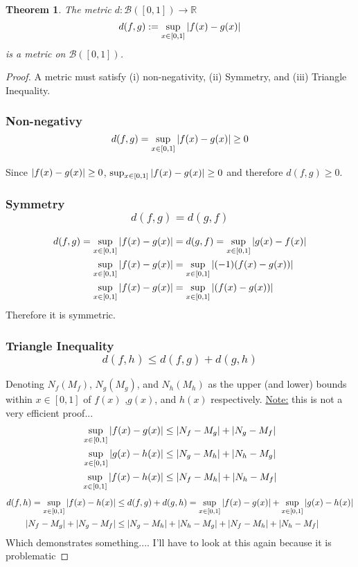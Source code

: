 \documentclass[]{article}
\newcommand{\R}{\mathbb{R}}
\newtheorem{theorem}{Theorem}
\begin{document}
\begin{theorem}
    The metric $d : \mathcal{B}([0,1]) \to \R$
    \[d(f,g) := \sup_{x \in [0,1]} \abs{f(x) - g(x)}\]
    is a metric on $\mathcal{B}([0,1])$.
\end{theorem}
\begin{proof}
    A metric must satisfy (i) non-negativity, 
    (ii) Symmetry, and (iii) Triangle Inequality.
    \subsubsection{Non-negativy \[d(f,g) = \sup_{x \in [0,1]} \abs{f(x) - g(x)} \geq 0\]}
        Since $\abs{f(x) - g(x)} \geq 0$, $\sup_{x \in [0,1]} \abs{f(x) - g(x)} \geq 0$ and therefore $d(f,g) \geq 0$.
    \subsubsection{Symmetry \[d(f,g) = d(g,f)\]}
    \begin{align*}
        d(f,g) = \sup_{x \in [0,1]} \abs{f(x) - g(x)} &= d(g,f) = \sup_{x \in [0,1]} \abs{g(x) - f(x)}\\
        \sup_{x \in [0,1]} \abs{f(x) - g(x)} &= \sup_{x \in [0,1]} \abs{(-1)(f(x) -g(x))}\\
        \sup_{x \in [0,1]} \abs{f(x) - g(x)} &= \sup_{x \in [0,1]} \abs{(f(x) -g(x))}
    \end{align*}
    Therefore it is symmetric.
    \subsubsection{Triangle Inequality \[d(f,h) \leq d(f,g) + d(g,h)\]}
    Denoting $N_f (M_f)$, $N_g (M_g)$, and $N_h (M_h)$ as the upper (and lower) bounds within $x \in [0,1]$ of $f(x)$ ,$g(x)$, and $h(x)$ respectively. \underline{Note:} this is not a very efficient proof...
    \begin{align*}
        \sup_{x \in [0,1]} \abs{f(x) - g(x)} &\leq \abs{N_f - M_g} + \abs{N_g - M_f}\\
        \sup_{x \in [0,1]} \abs{g(x) - h(x)} &\leq \abs{N_g - M_h} + \abs{N_h - M_g}\\
        \sup_{x \in [0,1]} \abs{f(x) - h(x)} &\leq \abs{N_f - M_h} + \abs{N_h - M_f}
    \end{align*}
    \begin{align*}
        d(f,h) = \sup_{x \in [0,1]} \abs{f(x) - h(x)} 
            &\leq d(f,g) + d(g,h) = \sup_{x \in [0,1]} \abs{f(x) - g(x)} + \sup_{x \in [0,1]} \abs{g(x) - h(x)}\\
        \abs{N_f - M_g} + \abs{N_g - M_f} &\leq \abs{N_g - M_h} + \abs{N_h - M_g} + \abs{N_f - M_h} + \abs{N_h - M_f}
    \end{align*}
    Which demonstrates something.... I'll have to look at this again because it is problematic
\end{proof}
\end{document}
